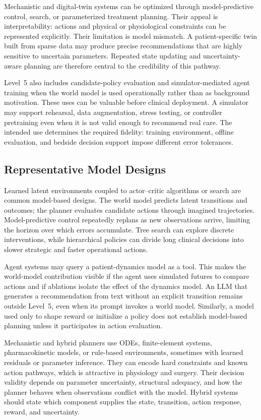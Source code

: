 Mechanistic and digital-twin systems can be optimized through model-predictive control, search, or parameterized treatment planning. Their appeal is interpretability: actions and physical or physiological constraints can be represented explicitly. Their limitation is model mismatch. A patient-specific twin built from sparse data may produce precise recommendations that are highly sensitive to uncertain parameters. Repeated state updating and uncertainty-aware planning are therefore central to the credibility of this pathway.

Level~5 also includes candidate-policy evaluation and simulator-mediated agent training when the world model is used operationally rather than as background motivation. These uses can be valuable before clinical deployment. A simulator may support rehearsal, data augmentation, stress testing, or controller pretraining even when it is not valid enough to recommend real care. The intended use determines the required fidelity: training environment, offline evaluation, and bedside decision support impose different error tolerances.

\subsection{Representative Model Designs}

Learned latent environments coupled to actor--critic algorithms or search are common model-based designs. The world model predicts latent transitions and outcomes; the planner evaluates candidate actions through imagined trajectories. Model-predictive control repeatedly replans as new observations arrive, limiting the horizon over which errors accumulate. Tree search can explore discrete interventions, while hierarchical policies can divide long clinical decisions into slower strategic and faster operational actions.

Agent systems may query a patient-dynamics model as a tool. This makes the world-model contribution visible if the agent uses simulated futures to compare actions and if ablations isolate the effect of the dynamics model. An LLM that generates a recommendation from text without an explicit transition remains outside Level~5, even when its prompt invokes a world model. Similarly, a model used only to shape reward or initialize a policy does not establish model-based planning unless it participates in action evaluation.

Mechanistic and hybrid planners use ODEs, finite-element systems, pharmacokinetic models, or rule-based environments, sometimes with learned residuals or parameter inference. They can encode hard constraints and known action pathways, which is attractive in physiology and surgery. Their decision validity depends on parameter uncertainty, structural adequacy, and how the planner behaves when observations conflict with the model. Hybrid systems should state which component supplies the state, transition, action response, reward, and uncertainty.

